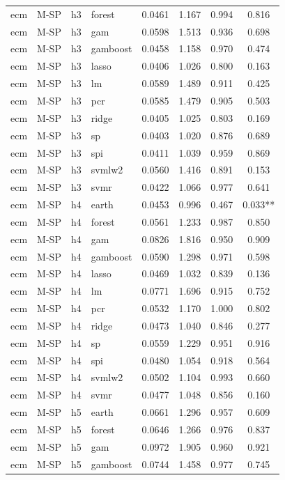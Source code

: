 \begin{ThreePartTable}
\begin{longtable}[t]{llclcccc}
ecm & M-SP & h3 & forest & 0.0461 & 1.167 & 0.994 & 0.816\\
ecm & M-SP & h3 & gam & 0.0598 & 1.513 & 0.936 & 0.698\\
ecm & M-SP & h3 & gamboost & 0.0458 & 1.158 & 0.970 & 0.474\\
ecm & M-SP & h3 & lasso & 0.0406 & 1.026 & 0.800 & 0.163\\
ecm & M-SP & h3 & lm & 0.0589 & 1.489 & 0.911 & 0.425\\
ecm & M-SP & h3 & pcr & 0.0585 & 1.479 & 0.905 & 0.503\\
ecm & M-SP & h3 & ridge & 0.0405 & 1.025 & 0.803 & 0.169\\
ecm & M-SP & h3 & sp & 0.0403 & 1.020 & 0.876 & 0.689\\
ecm & M-SP & h3 & spi & 0.0411 & 1.039 & 0.959 & 0.869\\
ecm & M-SP & h3 & svmlw2 & 0.0560 & 1.416 & 0.891 & 0.153\\
ecm & M-SP & h3 & svmr & 0.0422 & 1.066 & 0.977 & 0.641\\
\addlinespace
ecm & M-SP & h4 & earth & 0.0453 & 0.996 & 0.467 & 0.033**\\
ecm & M-SP & h4 & forest & 0.0561 & 1.233 & 0.987 & 0.850\\
ecm & M-SP & h4 & gam & 0.0826 & 1.816 & 0.950 & 0.909\\
ecm & M-SP & h4 & gamboost & 0.0590 & 1.298 & 0.971 & 0.598\\
ecm & M-SP & h4 & lasso & 0.0469 & 1.032 & 0.839 & 0.136\\
ecm & M-SP & h4 & lm & 0.0771 & 1.696 & 0.915 & 0.752\\
ecm & M-SP & h4 & pcr & 0.0532 & 1.170 & 1.000 & 0.802\\
ecm & M-SP & h4 & ridge & 0.0473 & 1.040 & 0.846 & 0.277\\
ecm & M-SP & h4 & sp & 0.0559 & 1.229 & 0.951 & 0.916\\
ecm & M-SP & h4 & spi & 0.0480 & 1.054 & 0.918 & 0.564\\
ecm & M-SP & h4 & svmlw2 & 0.0502 & 1.104 & 0.993 & 0.660\\
ecm & M-SP & h4 & svmr & 0.0477 & 1.048 & 0.856 & 0.160\\
\addlinespace
ecm & M-SP & h5 & earth & 0.0661 & 1.296 & 0.957 & 0.609\\
ecm & M-SP & h5 & forest & 0.0646 & 1.266 & 0.976 & 0.837\\
ecm & M-SP & h5 & gam & 0.0972 & 1.905 & 0.960 & 0.921\\
ecm & M-SP & h5 & gamboost & 0.0744 & 1.458 & 0.977 & 0.745\\

\end{longtable}
\end{ThreePartTable}
